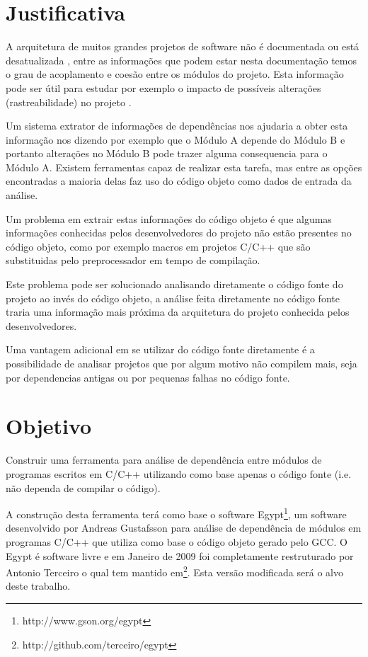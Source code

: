 \chapter{Justificativa}

A arquitetura de muitos grandes projetos de software não é documentada ou está
desatualizada \cite{SourceVersusObjectCodeExtraction}, entre as informações que
podem estar nesta documentação temos o grau de acoplamento e coesão entre os
módulos do projeto. Esta informação pode ser útil para estudar por exemplo o
impacto de possíveis alterações (rastreabilidade) no projeto
\cite{mata26-terceiro-projeto-piloto}.

Um sistema extrator de informações de dependências nos ajudaria a obter esta
informação nos dizendo por exemplo que o Módulo A depende do Módulo B e
portanto alterações no Módulo B pode trazer alguma consequencia para o Módulo
A. Existem ferramentas capaz de realizar esta tarefa, mas entre as opções
encontradas\cite{SourceVersusObjectCodeExtraction} a maioria delas faz uso do
código objeto como dados de entrada da análise.

Um problema em extrair estas informações do código objeto é que algumas
informações conhecidas pelos desenvolvedores do projeto não estão presentes no
código objeto, como por exemplo macros em projetos C/C++ que são substituidas pelo
preprocessador\cite{SourceVersusObjectCodeExtraction} em tempo de compilação.

Este problema pode ser solucionado analisando diretamente o código fonte do
projeto ao invés do código objeto, a análise feita diretamente no código fonte
traria uma informação mais próxima da arquitetura do projeto conhecida pelos
desenvolvedores.

Uma vantagem adicional em se utilizar do código fonte diretamente é a
possibilidade de analisar projetos que por algum motivo não compilem mais, seja
por dependencias antigas ou por pequenas falhas no código fonte.

\chapter{Objetivo}

Construir uma ferramenta para análise de dependência entre módulos de programas
escritos em C/C++ utilizando como base apenas o código fonte (i.e.  não dependa
de compilar o código).

A construção desta ferramenta terá como base o software
Egypt\footnote{http://www.gson.org/egypt}, um software desenvolvido por Andreas
Gustafsson para análise de dependência de módulos em programas C/C++ que
utiliza como base o código objeto gerado pelo GCC. O Egypt é software livre e
em Janeiro de 2009 foi completamente restruturado por Antonio Terceiro o qual
tem mantido em\footnote{http://github.com/terceiro/egypt}. Esta versão modificada será
o alvo deste trabalho.

